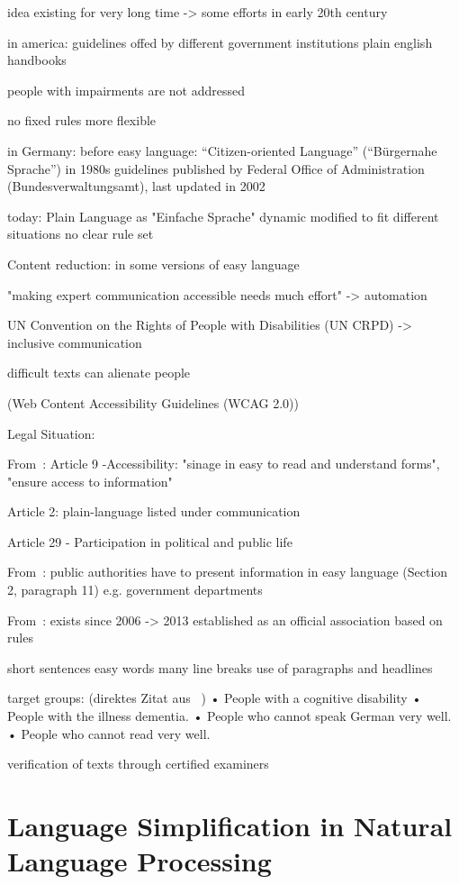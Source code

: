 idea existing for very long time -> some efforts in early 20th century

in america: guidelines offed by different government institutions
plain english handbooks

people with impairments are not addressed

no fixed rules
more flexible

in Germany:
before easy language: “Citizen-oriented Language” (“Bürgernahe Sprache”) in 1980s
guidelines published by Federal Office of Administration (Bundesverwaltungsamt), last updated in 2002

today: Plain Language as "Einfache Sprache"
dynamic
modified to fit different situations
no clear rule set



Content reduction:
in some versions of easy language



"making expert communication accessible needs much effort" -> automation

UN Convention on the Rights of People with Disabilities (UN CRPD) -> inclusive communication

difficult texts can alienate people

(Web Content Accessibility Guidelines (WCAG 2.0))


Legal Situation:


From~\autocite{un2008}:
Article 9 -Accessibility: "sinage in easy to read and understand forms", "ensure access to information"

Article 2: plain-language listed under communication

Article 29 - Participation in political and public life



From~\autocite{bgg2018}:
public authorities have to present information in easy language (Section 2, paragraph 11) e.g\@. government departments


From~\autocite{netzwerkLS}:
exists since 2006 -> 2013 established as an official association
based on rules

short sentences
easy words
many line breaks
use of paragraphs and headlines


target groups:
(direktes Zitat aus ~\autocite{easyLanguageBook})
• People with a cognitive disability
• People with the illness dementia.
• People who cannot speak German very well.
• People who cannot read very well.

verification of texts through certified examiners


\section{Language Simplification in Natural Language Processing}\label{sec:langSimp}

